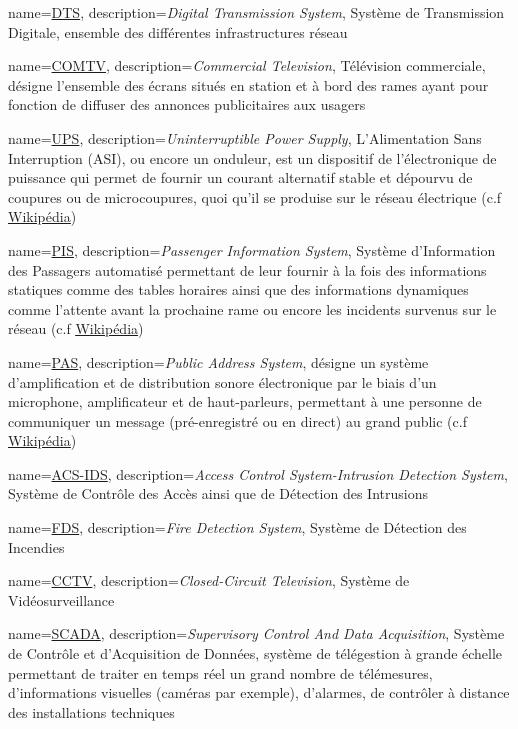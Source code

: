 {
	name=\underline{DTS},
	description={\textit{Digital Transmission System}, Système de Transmission Digitale, ensemble des différentes infrastructures réseau}
}

{
	name=\underline{COMTV},
	description={\textit{Commercial Television}, Télévision commerciale, désigne l'ensemble des écrans situés en station et à bord des rames ayant pour fonction de diffuser des annonces publicitaires aux usagers}
}

{
	name=\underline{UPS},
	description={\textit{Uninterruptible Power Supply}, L'Alimentation Sans Interruption (ASI), ou encore un onduleur, est un dispositif de l'électronique de puissance qui permet de fournir un courant alternatif stable et dépourvu de coupures ou de microcoupures, quoi qu'il se produise sur le réseau électrique (c.f \underline{\href{https://fr.wikipedia.org/wiki/Alimentation_sans_interruption}{Wikipédia}})}
}


{
	name=\underline{PIS},
	description={\textit{Passenger Information System}, Système d'Information des Passagers automatisé permettant de leur fournir à la fois des informations statiques comme des tables horaires ainsi que des informations dynamiques comme l'attente avant la prochaine rame ou encore les incidents survenus sur le réseau (c.f \underline{\href{https://en.wikipedia.org/wiki/Passenger_information_system}{Wikipédia}})}
}

{
	name=\underline{PAS},
	description={\textit{Public Address System}, désigne un système d'amplification et de distribution sonore électronique par le biais d'un microphone, amplificateur et de haut-parleurs, permettant à une personne de communiquer un message (pré-enregistré ou en direct) au grand public (c.f \underline{\href{https://en.wikipedia.org/wiki/Public_address_system}{Wikipédia}})}
}

{
	name=\underline{ACS-IDS},
	description={\textit{Access Control System-Intrusion Detection System}, Système de Contrôle des Accès ainsi que de Détection des Intrusions}
}

{
	name=\underline{FDS},
	description={\textit{Fire Detection System}, Système de Détection des Incendies}
}

{
	name=\underline{CCTV},
	description={\textit{Closed-Circuit Television}, Système de Vidéosurveillance}
}

{
	name=\underline{SCADA},
	description={\textit{Supervisory Control And Data Acquisition}, Système de Contrôle et d'Acquisition de Données, système de télégestion à grande échelle permettant de traiter en temps réel un grand nombre de télémesures, d'informations visuelles (caméras par exemple), d'alarmes, de contrôler à distance des installations techniques}
}

